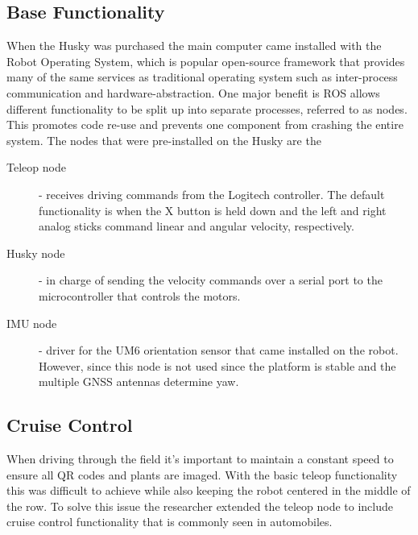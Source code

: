 \subsection{Base Functionality}
\label{section:base_functionality}

When the Husky was purchased the main computer came installed with the Robot Operating System, which is popular open-source framework that provides many of the same services as traditional operating system such as inter-process communication and hardware-abstraction.  One major benefit is ROS allows different functionality to be split up into separate processes, referred to as nodes.  This promotes code re-use and prevents one component from crashing the entire system.   The nodes that were pre-installed on the Husky are the

\begin{description}
\item[Teleop node] - receives driving commands from the Logitech controller.  The default functionality is when the X button is held down and the left and right analog sticks command linear and angular velocity, respectively.
\item[Husky node] - in charge of sending the velocity commands over a serial port to the microcontroller that controls the motors.  
\item[IMU node] - driver for the UM6 orientation sensor that came installed on the robot.  However, since this node is not used since the platform is stable and the multiple GNSS antennas determine yaw.
\end{description}

\subsection{Cruise Control}

When driving through the field it's important to maintain a constant speed to ensure all QR codes and plants are imaged.  With the basic teleop functionality this was difficult to achieve while also keeping the robot centered in the middle of the row. To solve this issue the researcher extended the teleop node to include cruise control functionality that is commonly seen in automobiles.  

